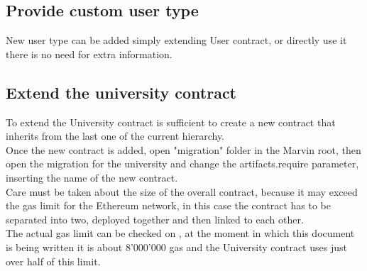 \documentclass[ManualeSviluppatore.tex]{subfiles}
\begin{document}
\subsection{Provide custom user type}
New user type can be added simply extending User contract, or directly use it there is no need for extra information. \\

\subsection{Extend the university contract}
To extend the University contract is sufficient to create a new contract that inherits from the last one of the current hierarchy. \\
Once the new contract is added, open "migration" folder in the Marvin root, then open the migration for the university and change the artifacts.require parameter, inserting the name of the new contract. \\
Care must be taken about the size of the overall contract, because it may exceed the gas limit for the Ethereum network, in this case the contract has to be separated into two, deployed together and then linked to each other. \\
The actual gas limit can be checked on , at the moment in which this document is being written it is about 8'000'000 gas and the University contract uses just over half of this limit. \\
\end{document}
